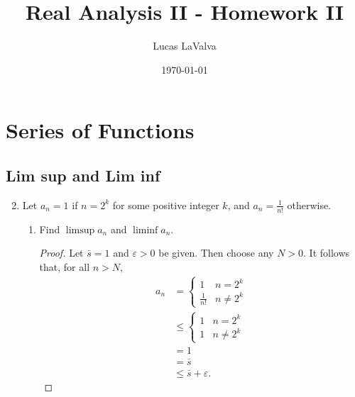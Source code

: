\documentclass{article}
\title{Real Analysis II - Homework II}
\author{Lucas LaValva}
\date{\today}
\begin{document}
\maketitle

\setcounter{section}{5}

\section{Series of Functions}

\subsection{Lim sup and Lim inf}
\begin{enumerate}
      \setcounter{enumi}{1}
      \item Let $a_n=1$ if $n=2^k$ for some positive integer $k$,
            and $a_n=\frac{1}{n!}$ otherwise.
            \begin{enumerate}
                  \item Find $\limsup a_n$ and $\liminf a_n$.
                        \begin{proof}
                              Let $\bar s=1$ and $\varepsilon>0$ be given.
                              Then choose any $N>0$.
                              It follows that, for all $n>N$,
                              \begin{align*}
                                    a_n & = \begin{cases}
                                          1            & n=2^k      \\
                                          \frac{1}{n!} & n \neq 2^k
                                    \end{cases}    \\
                                        & \leq \begin{cases}
                                          1 & n=2^k      \\
                                          1 & n \neq 2^k
                                    \end{cases} \\
                                        & = 1                            \\
                                        & = \bar s                       \\
                                        & \leq \bar s + \varepsilon.
                              \end{align*}

\end{proof}
\end{enumerate}
\end{enumerate}
\end{document}
